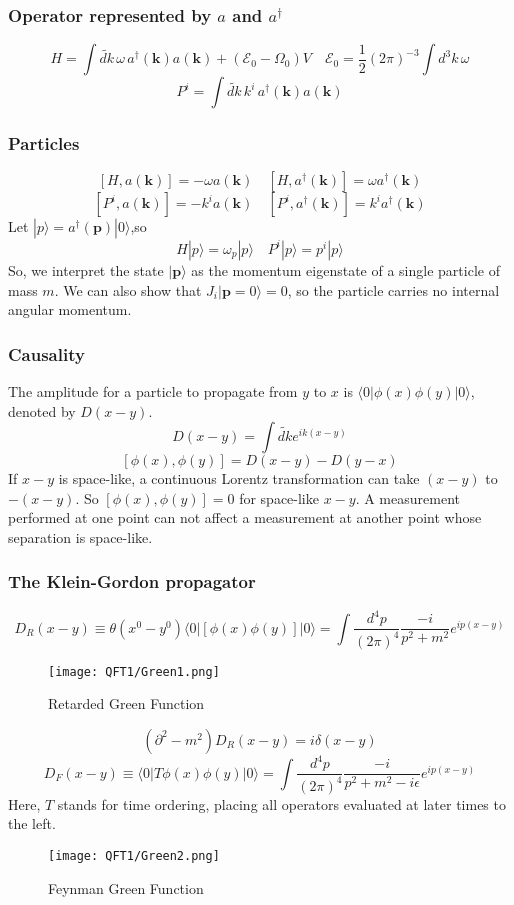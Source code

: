 \documentclass[cyan]{elegantnote}
\begin{document}
\subsubsection{Operator represented by $a$ and $a^{\dagger}$}
\[H=\int \widetilde{dk}\, \omega\, a^{\dagger}(\bm{k})a(\bm{k}) + (\mathcal{E}_0 - \Omega_0)V \quad \mathcal{E}_0 = \frac{1}{2}(2\pi)^{-3}\int d^3 k \,\omega\]
\[P^{i}=\int \widetilde{dk}\, k^{i}\, a^{\dagger}(\bm{k})a(\bm{k}) \]
\subsubsection{Particles}
\[[H,a(\bm{k})] = -\omega a(\bm{k}) \quad [H,a^{\dagger}(\bm{k})] = \omega a^{\dagger}(\bm{k})\]
\[[P^i,a(\bm{k})] = -k^i a(\bm{k}) \quad [P^i,a^{\dagger}(\bm{k})] = k^i a^{\dagger}(\bm{k})\]
Let $|p\rangle = a^{\dagger}(\bm{p})|0\rangle $,so
\[H |p\rangle = \omega_p|p\rangle \quad P^i |p\rangle = p^i|p\rangle\]
So, we interpret the state $|\bm{p}\rangle$ as the momentum eigenstate of a single particle of mass $m$. We can also show that 
$J_i|\bm{p} = 0\rangle = 0$, so the particle carries no internal angular momentum.
\subsubsection{Causality}
\noindent
The amplitude for a particle to propagate from $y$ to $x$ is $\langle 0 | \phi(x) \phi(y) | 0 \rangle$, denoted by $D(x-y)$.
\[D(x-y) = \int \widetilde{dk} e^{ik(x-y)}\]
\[[\phi(x),\phi(y)] = D(x-y) -D(y-x)\]
If $x-y$ is space-like, a continuous Lorentz transformation can take $(x-y)$ to $-(x-y)$. So $[\phi(x),\phi(y)] =0$ for space-like $x-y$. A measurement performed at one point can not affect a measurement at another point whose separation is space-like.
\subsubsection{The Klein-Gordon propagator}
\[D_R(x-y) \equiv \theta(x^0-y^0) \langle 0 | [\phi(x) \phi(y)] | 0 \rangle = \int \frac{d^4 p}{(2\pi)^4} \frac{-i}{p^2+m^2} e^{ip(x-y)}\]
\begin{figure}[!h]
\centering
\texttt{[image: QFT1/Green1.png]}
\caption{Retarded Green Function}
\end{figure}
\[(\partial^2-m^2) D_R(x-y) = i \delta(x-y)\]
\[D_F(x-y) \equiv \langle 0 | T\phi(x) \phi(y) | 0 \rangle = \int \frac{d^4 p}{(2\pi)^4} \frac{-i}{p^2+m^2-i\epsilon} e^{ip(x-y)}\]
Here, $T$ stands for time ordering, placing all operators evaluated at later times to the left.
\begin{figure}[!h]
\centering
\texttt{[image: QFT1/Green2.png]}
\caption{Feynman Green Function}
\end{figure}
\end{document}
